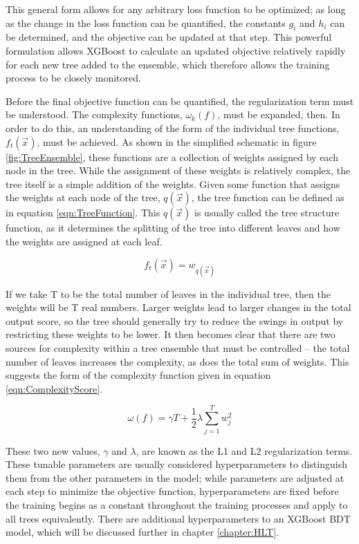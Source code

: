 \documentclass[12pt]{ucsddissertation}
\begin{document}
This general form allows for any arbitrary loss function to be optimized; as long as the change in the loss function can be quantified, the constants $g_i$ and $h_i$ can be determined, and the objective can be updated at that step. This powerful formulation allows XGBoost to calculate an updated objective relatively rapidly for each new tree added to the ensemble, which therefore allows the training process to be closely monitored.

Before the final objective function can be quantified, the regularization term must be understood. The complexity functions, $\omega_k(f)$, must be expanded, then. In order to do this, an understanding of the form of the individual tree functions, $f_t(\vec{x})$, must be achieved. As shown in the simplified schematic in figure \ref{fig:TreeEnsemble}, these functions are a collection of weights assigned by each node in the tree. While the assignment of these weights is relatively complex, the tree itself is a simple addition of the weights. Given some function that assigns the weights at each node of the tree, $q(\vec{x})$, the tree function can be defined as in equation \ref{eqn:TreeFunction}. This $q(\vec{x})$ is usually called the tree structure function, as it determines the splitting of the tree into different leaves and how the weights are assigned at each leaf.

\begin{equation}\label{eqn:TreeFunction}
    f_t(\vec{x}) = w_{q(\vec{x})}
\end{equation}

If we take T to be the total number of leaves in the individual tree, then the weights will be T real numbers. Larger weights lead to larger changes in the total output score, so the tree should generally try to reduce the swings in output by restricting these weights to be lower. It then becomes clear that there are two sources for complexity within a tree ensemble that must be controlled -- the total number of leaves increases the complexity, as does the total sum of weights. This suggests the form of the complexity function given in equation \ref{eqn:ComplexityScore}. 

\begin{equation}\label{eqn:ComplexityScore}
    \omega(f) = \gamma T + \frac{1}{2} \lambda \sum_{j=1}^{T}w^2_j
\end{equation}

These two new values, $\gamma$ and $\lambda$, are known as the L1 and L2 regularization terms. These tunable parameters are usually considered hyperparameters to distinguish them from the other parameters in the model; while parameters are adjusted at each step to minimize the objective function, hyperparameters are fixed before the training begins as a constant throughout the training processes and apply to all trees equivalently. There are additional hyperparameters to an XGBoost BDT model, which will be discussed further in chapter \ref{chapter:HLT}. 
\end{document}
